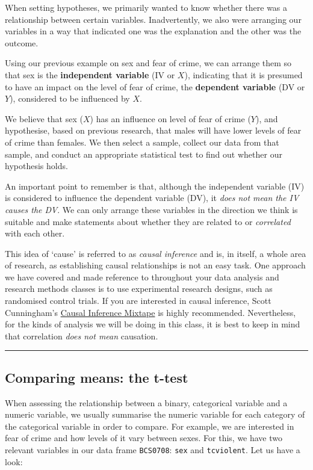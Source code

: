 \documentclass[
]{book}
\begin{document}
When setting hypotheses, we primarily wanted to know whether there was a relationship between certain variables. Inadvertently, we also were arranging our variables in a way that indicated one was the explanation and the other was the outcome.

Using our previous example on sex and fear of crime, we can arrange them so that sex is the \textbf{independent variable} (IV or \(X\)), indicating that it is presumed to have an impact on the level of fear of crime, the \textbf{dependent variable} (DV or \(Y\)), considered to be influenced by \(X\).

We believe that sex (\(X\)) has an influence on level of fear of crime (\(Y\)), and hypothesise, based on previous research, that males will have lower levels of fear of crime than females. We then select a sample, collect our data from that sample, and conduct an appropriate statistical test to find out whether our hypothesis holds.

An important point to remember is that, although the independent variable (IV) is considered to influence the dependent variable (DV), it \emph{does not mean the IV causes the DV}. We can only arrange these variables in the direction we think is suitable and make statements about whether they are related to or \emph{correlated} with each other.

This idea of `cause' is referred to as \emph{causal inference} and is, in itself, a whole area of research, as establishing causal relationships is not an easy task. One approach we have covered and made reference to throughout your data analysis and research methods classes is to use experimental research designs, such as randomised control trials. If you are interested in causal inference, Scott Cunningham's \href{https://www.scunning.com/mixtape.html}{Causal Inference Mixtape} is highly recommended. Nevertheless, for the kinds of analysis we will be doing in this class, it is best to keep in mind that correlation \emph{does not mean} causation.

\begin{center}\rule{0.5\linewidth}{0.5pt}\end{center}

\hypertarget{comparing-means-the-t-test}{%
\subsection{Comparing means: the t-test}\label{comparing-means-the-t-test}}

When assessing the relationship between a binary, categorical variable and a numeric variable, we usually summarise the numeric variable for each category of the categorical variable in order to compare. For example, we are interested in fear of crime and how levels of it vary between sexes. For this, we have two relevant variables in our data frame \texttt{BCS0708}: \texttt{sex} and \texttt{tcviolent}. Let us have a look:
\end{document}
